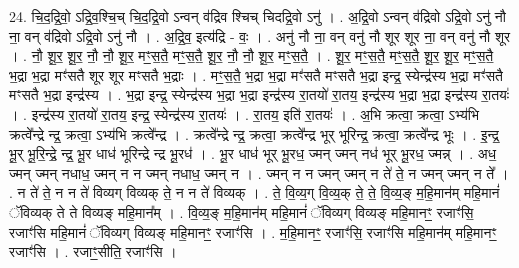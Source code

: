 \documentclass[17pt]{extarticle}
\begin{document}
24. चि॒द॒द्रि॒वो॒ ऽद्रि॒व॒श्चि॒च् चि॒द॒द्रि॒वो ऽन्वन् व॑द्रिव श्चिच् चिदद्रि॒वो ऽनु॑ । . अ॒द्रि॒वो ऽन्वन् व॑द्रिवो ऽद्रि॒वो ऽनु॑ नौ ना॒ वन् व॑द्रिवो ऽद्रि॒वो ऽनु॑ नौ । . अ॒द्रि॒व॒ इत्य॑द्रि - वः॒ । . अनु॑ नौ ना॒ वन् वनु॑ नौ शूर शूर ना॒ वन् वनु॑ नौ शूर । . नौ॒ शू॒र॒ शू॒र॒ नौ॒ नौ॒ शू॒र॒ मꣳ॒॒स॒तै॒ मꣳ॒॒स॒तै॒ शू॒र॒ नौ॒ नौ॒ शू॒र॒ मꣳ॒॒स॒तै॒ । . शू॒र॒ मꣳ॒॒स॒तै॒ मꣳ॒॒स॒तै॒ शू॒र॒ शू॒र॒ मꣳ॒॒स॒तै॒ भ॒द्रा भ॒द्रा मꣳ॑सतै शूर शूर मꣳसतै भ॒द्राः । . मꣳ॒॒स॒तै॒ भ॒द्रा भ॒द्रा मꣳ॑सतै मꣳसतै भ॒द्रा इन्द्र॒ स्येन्द्र॑स्य भ॒द्रा मꣳ॑सतै मꣳसतै भ॒द्रा इन्द्र॑स्य । . भ॒द्रा इन्द्र॒ स्येन्द्र॑स्य भ॒द्रा भ॒द्रा इन्द्र॑स्य रा॒तयो॑ रा॒तय॒ इन्द्र॑स्य भ॒द्रा भ॒द्रा इन्द्र॑स्य रा॒तयः॑ । . इन्द्र॑स्य रा॒तयो॑ रा॒तय॒ इन्द्र॒ स्येन्द्र॑स्य रा॒तयः॑ । . रा॒तय॒ इति॑ रा॒तयः॑ । . अ॒भि क्रत्वा॒ क्रत्वा॒ ऽभ्य॑भि क्रत्वे᳚न्द्रे न्द्र॒ क्रत्वा॒ ऽभ्य॑भि क्रत्वे᳚न्द्र । . क्रत्वे᳚न्द्रे न्द्र॒ क्रत्वा॒ क्रत्वे᳚न्द्र भूर् भूरिन्द्र॒ क्रत्वा॒ क्रत्वे᳚न्द्र भूः । . इ॒न्द्र॒ भू॒र् भू॒रि॒न्द्रे॒ न्द्र॒ भू॒र धाध॑ भूरिन्द्रे न्द्र भू॒रध॑ । . भू॒र धाध॑ भूर् भू॒रध॒ ज्मन् ज्मन् नध॑ भूर् भू॒रध॒ ज्मन्न् । . अध॒ ज्मन् ज्मन् नधाध॒ ज्मन् न न ज्मन् नधाध॒ ज्मन् न । . ज्मन् न न ज्मन् ज्मन् न ते॑ ते॒ न ज्मन् ज्मन् न ते᳚ । . न ते॑ ते॒ न न ते॑ विव्यग् विव्यक् ते॒ न न ते॑ विव्यक् । . ते॒ वि॒व्य॒ग् वि॒व्य॒क् ते॒ ते॒ वि॒व्य॒ङ् म॒हि॒मान॑म् महि॒मानं॑ ॅविव्यक् ते ते विव्यङ् महि॒मान᳚म् । . वि॒व्य॒ङ् म॒हि॒मान॑म् महि॒मानं॑ ॅविव्यग् विव्यङ् महि॒मानꣳ॒॒ रजाꣳ॑सि॒ रजाꣳ॑सि महि॒मानं॑ ॅविव्यग् विव्यङ् महि॒मानꣳ॒॒ रजाꣳ॑सि । . म॒हि॒मानꣳ॒॒ रजाꣳ॑सि॒ रजाꣳ॑सि महि॒मान॑म् महि॒मानꣳ॒॒ रजाꣳ॑सि । . रजाꣳ॒॒सीति॒ रजाꣳ॑सि । \newline
\end{document}
